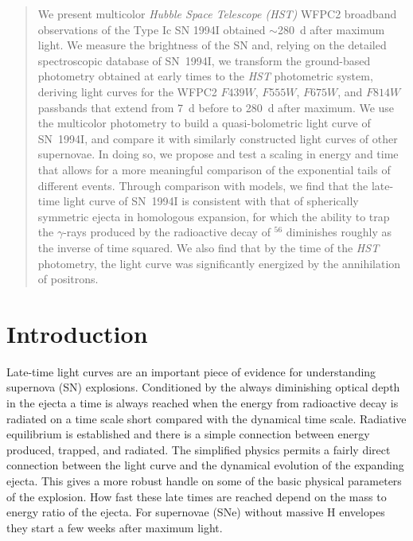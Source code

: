 \documentclass[12pt,manuscript]{aastex}
\begin{document}
\begin{abstract}

We present multicolor {\em Hubble Space Telescope (HST)} WFPC2 
broadband observations of the Type Ic SN 1994I
obtained $\sim$280~d after maximum light.
%
We measure the brightness of the SN and,
relying on the detailed spectroscopic database of SN~1994I, we 
transform the ground-based photometry obtained at
early times to the {\em HST} photometric system,
deriving light curves for the WFPC2
$F439W$, $F555W$, $F675W$, and $F814W$ passbands that 
extend from 7~d before to 280~d after maximum.
%
We use the multicolor photometry to build a
quasi-bolometric light curve of SN~1994I, and compare it
with similarly constructed light curves of other supernovae.
%
In doing so, we propose and test a scaling in energy and time 
that allows for a more meaningful
comparison of the exponential tails of different events.
%
Through comparison with models, we find that the late-time light 
curve of SN~1994I is consistent with that of spherically symmetric 
ejecta in homologous expansion, for which the ability to trap 
the $\gamma$-rays produced by the radioactive decay of 
$^{56}$ diminishes roughly as the inverse of time squared.
%
We also find that by the time of the {\em HST} photometry, the 
light curve was significantly energized by the annihilation of 
positrons.

\end{abstract}


\section{Introduction}

Late-time light curves are an important piece of evidence for
understanding supernova (SN) explosions.
%
Conditioned by the always diminishing optical depth in the ejecta
a time is always reached when the energy from radioactive decay is radiated
on a time scale short compared with the dynamical time scale.
%
Radiative equilibrium is established and there is a simple 
connection between energy produced, trapped, and radiated.
%
The simplified physics permits a fairly direct connection between 
the light curve and the dynamical evolution of the expanding 
ejecta. This gives a more robust handle on some of the
basic physical parameters of the explosion.
%
How fast these late times are reached depend on the mass to energy ratio
of the ejecta.
%
For supernovae (SNe) without massive H envelopes they start a few weeks
after maximum light.
\end{document}
